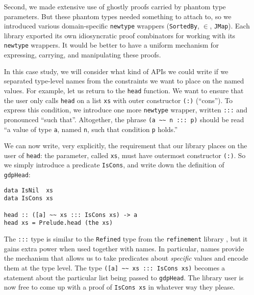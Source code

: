 \documentclass[format=sigplan, review=false, screen=true, 10pt]{acmart}
\begin{document}
Second, we made extensive use of ghostly proofs carried by phantom type parameters. But these
phantom types needed something to attach to, so we introduced various domain-specific \texttt{newtype}
wrappers (\texttt{SortedBy}, \texttt{$\in$},  \texttt{JMap}). Each library exported its own
idiosyncratic proof combinators for working with its \texttt{newtype} wrappers. It would be better to have
a uniform mechanism for expressing, carrying, and manipulating these proofs.

In this case study, we will consider what kind of APIs we could write if we separated
type-level names from the constraints we want to place on the named values.
For example, let us return to the \texttt{head} function. We want to ensure that the
user only calls \texttt{head} on a list \texttt{xs} with outer constructor \texttt{(:)} (``cons'').
To express this condition, we introduce one more \texttt{newtype} wrapper,
written \texttt{:::} and pronounced ``such that''. Altogether, the phrase 
\verb|(a ~~ n ::: p)| should be read ``a value of type \texttt{a}, named \texttt{n}, such
that condition \texttt{p} holds.''


We can now write, very explicitly, the requirement that our library places on the user
of \texttt{head}: the parameter, called \texttt{xs}, must have outermost constructor
\texttt{(:)}. So we simply introduce a predicate \texttt{IsCons}, and write down the definition
of \texttt{gdpHead}:
\begin{verbatim}
data IsNil  xs
data IsCons xs

head :: ([a] ~~ xs ::: IsCons xs) -> a
head xs = Prelude.head (the xs)
\end{verbatim}
The \texttt{:::} type is similar to the \texttt{Refined} type from the \texttt{refinement} library \cite{refined},
but it gains extra power when used together with names.
In particular, names provide the mechanism that allows us to take predicates about \emph{specific} values and
encode them at the type level.
The type \verb|([a] ~~ xs ::: IsCons xs)| becomes a statement about the particular list being passed to \texttt{gdpHead}.
The library user is now free to come up with a proof of \texttt{IsCons xs} in whatever way they please.
\end{document}
